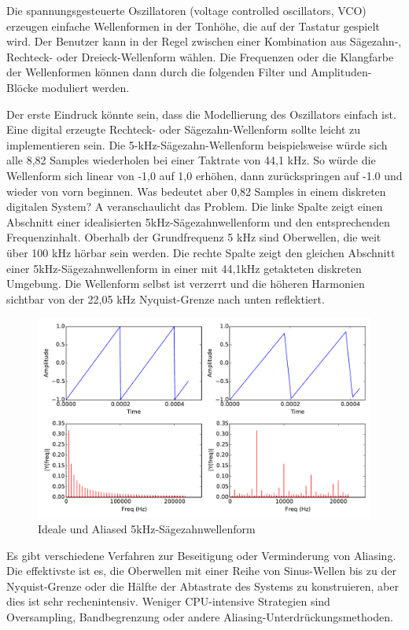 Die spannungsgesteuerte Oszillatoren (voltage controlled oscillators, VCO) erzeugen einfache Wellenformen in der Tonhöhe, die auf der Tastatur gespielt wird. Der Benutzer kann in der Regel zwischen einer Kombination aus Sägezahn-, Rechteck- oder Dreieck-Wellenform wählen. Die Frequenzen oder die Klangfarbe der Wellenformen können dann durch die folgenden Filter und Amplituden-Blöcke moduliert werden.

Der erste Eindruck könnte sein, dass die Modellierung des Oszillators einfach ist. Eine digital erzeugte Rechteck- oder Sägezahn-Wellenform sollte leicht zu implementieren sein. Die 5-kHz-Sägezahn-Wellenform beispielsweise würde sich alle 8,82 Samples wiederholen bei einer Taktrate von 44,1 kHz. So würde die Wellenform sich linear von -1,0 auf 1,0 erhöhen, dann zurückspringen auf -1.0 und wieder von vorn beginnen.  Was bedeutet aber 0,82 Samples in einem diskreten digitalen System? A veranschaulicht das Problem. Die linke Spalte zeigt einen Abschnitt einer idealisierten 5kHz-Sägezahnwellenform und den entsprechenden Frequenzinhalt. Oberhalb der Grundfrequenz 5 kHz sind Oberwellen, die weit über 100 kHz hörbar sein werden. Die rechte Spalte zeigt den gleichen Abschnitt einer 5kHz-Sägezahnwellenform in einer mit 44,1kHz getakteten diskreten Umgebung. Die Wellenform selbst ist verzerrt und die höheren Harmonien sichtbar von der 22,05 kHz Nyquist-Grenze nach unten reflektiert.

\begin{figure}[H]
    \centering
    \includegraphics[width=\textwidth]{plots/graphics/sawtooth.pdf}
    \caption{Ideale und Aliased 5kHz-Sägezahnwellenform}
    \label{fig:aliasing_sawtooth}
\end{figure}

Es gibt verschiedene Verfahren zur Beseitigung oder Verminderung von Aliasing. Die effektivste ist es, die Oberwellen mit einer Reihe von Sinus-Wellen bis zu der Nyquist-Grenze oder die Hälfte der Abtastrate des Systems zu konstruieren, aber dies ist sehr rechenintensiv. Weniger CPU-intensive Strategien sind Oversampling,  Bandbegrenzung oder andere Aliasing-Unterdrückungsmethoden.





